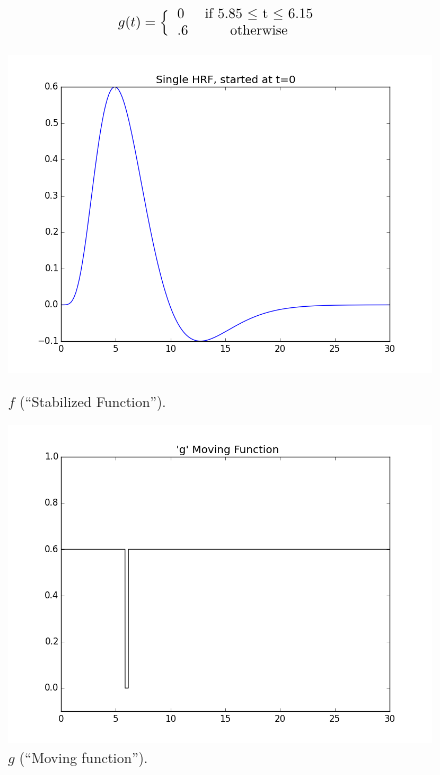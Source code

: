\begin{equation} \label{eq:step}
 g(t)=\Big \{ \begin{tabular}{l c}
 		0  & if  5.85 $\leq$ t $\leq$ 6.15\\
 		.6  & otherwise \\
 		\end{tabular} \end{equation}
 		
 		
\begin{figure}[ht]
\centering
\begin{minipage}[b]{0.45\linewidth}
	\centering
	\includegraphics[width=.8\linewidth]{../images/hrf_pattern.png} 
	\caption{$f$ (``Stabilized Function'').}
	\label{fig:f}
\end{minipage}	
\quad
\begin{minipage}[b]{0.45\linewidth}
	\centering
		\includegraphics[width=.8\linewidth]{../images/play.png} 
	\caption{$g$ (``Moving function'').}
	\label{fig:g}
\end{minipage}
\end{figure}



